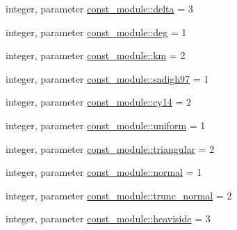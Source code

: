 \begin{DoxyCompactItemize}
\item 
integer, parameter \hyperlink{namespaceconst__module_a6bed9e9fc42a9b205a9214865ad145f5}{const\+\_\+module\+::delta} = 3
\item 
integer, parameter \hyperlink{namespaceconst__module_ad7dece49d5a2db833c491ea2eed54f52}{const\+\_\+module\+::deg} = 1
\item 
integer, parameter \hyperlink{namespaceconst__module_a4e8504d7945ca96447c578c95644bd5a}{const\+\_\+module\+::km} = 2
\item 
integer, parameter \hyperlink{namespaceconst__module_a83696a36c5a2e83e44cbfbbc479717a9}{const\+\_\+module\+::sadigh97} = 1
\item 
integer, parameter \hyperlink{namespaceconst__module_ac32c40069d129a7d06c22292afaae3ba}{const\+\_\+module\+::cy14} = 2
\item 
integer, parameter \hyperlink{namespaceconst__module_a91a738fc17a72ffc4e34e5141cccc469}{const\+\_\+module\+::uniform} = 1
\item 
integer, parameter \hyperlink{namespaceconst__module_a7e2946932c4a8471477923bc49aeafe4}{const\+\_\+module\+::triangular} = 2
\item 
integer, parameter \hyperlink{namespaceconst__module_a8010dcce5207fede7f1da8dbde0b5be8}{const\+\_\+module\+::normal} = 1
\item 
integer, parameter \hyperlink{namespaceconst__module_a3895bfacad51cb8237e9cae087b1663a}{const\+\_\+module\+::trunc\+\_\+normal} = 2
\item 
integer, parameter \hyperlink{namespaceconst__module_a0a0ee9e64316ae52e9c539987c5d18d5}{const\+\_\+module\+::heaviside} = 3
\end{DoxyCompactItemize}
